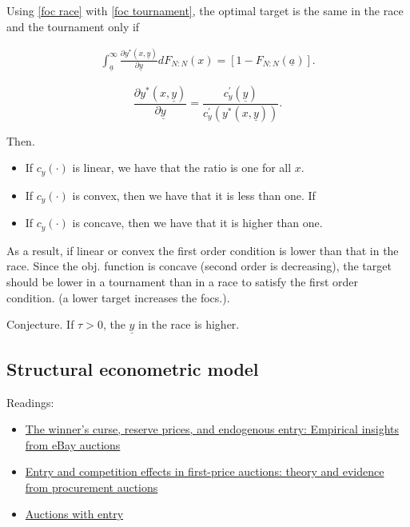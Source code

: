 \documentclass[12pt,]{article}
\newcommand\target{\underline{y}}
\newcommand\mtype{\underline{a}}
\newcommand\dystar{\frac{\partial y^*(x,\target)}{\partial\target}dF_{N:N}(x)}
\begin{document}
Using \eqref{foc race} with \eqref{foc tournament}, the optimal target
is the same in the race and the tournament only if

\begin{align} 
  \int_{\mtype}^\infty \dystar = [1- F_{N:N}(\mtype)].
\end{align}

\[
  \frac{\partial y^*(x, \target)}{\partial \target} = 
    \frac{c_y^\prime(\target)}{c_y^\prime(y^*(x, \target))}. 
\]

Then.

\begin{itemize}
\item
  If \(c_y(\cdot)\) is linear, we have that the ratio is one for all
  \(x\).
\item
  If \(c_y(\cdot)\) is convex, then we have that it is less than one. If
\item
  If \(c_y(\cdot)\) is concave, then we have that it is higher than one.
\end{itemize}

As a result, if linear or convex the first order condition is lower than
that in the race. Since the obj. function is concave (second order is
decreasing), the target should be lower in a tournament than in a race
to satisfy the first order condition. (a lower target increases the
focs.).

Conjecture. If \(\tau>0\), the \(\target\) in the race is higher.

\subsection{Structural econometric
model}\label{structural-econometric-model}

Readings:

\begin{itemize}
\item
  \href{http://citeseerx.ist.psu.edu/viewdoc/download?doi=10.1.1.199.680\&rep=rep1\&type=pdf}{The
  winner's curse, reserve prices, and endogenous entry: Empirical
  insights from eBay auctions}
\item
  \href{https://www.econstor.eu/bitstream/10419/79263/1/516364804.pdf}{Entry
  and competition effects in first-price auctions: theory and evidence
  from procurement auctions}
\item
  \href{http://www.vita.mcafee.cc/PDF/AuctionswithEntry.pdf}{Auctions
  with entry}
\end{itemize}
\end{document}
